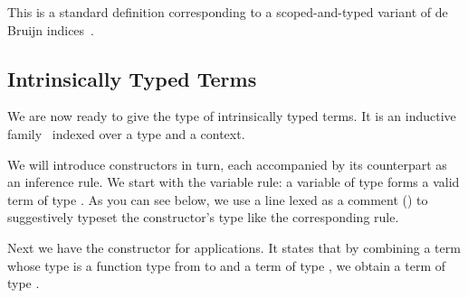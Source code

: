 \documentclass{article}
\begin{document}
\noindent
\begin{minipage}{.5\textwidth}
\end{minipage}\hfill
\begin{minipage}{.45\textwidth}
\end{minipage}

This is a standard definition
corresponding to a scoped-and-typed variant of de Bruijn
indices~\cite{de1972lambda}.

\subsection{Intrinsically Typed Terms}

We are now ready to give the type of intrinsically typed terms.
It is an inductive family~\cite{DBLP:journals/fac/Dybjer94}
indexed over a type and a context.


We will introduce constructors in turn, each accompanied by its
counterpart as an inference rule.
%
We start with the variable rule: a variable of type 
forms a valid term of type .
%
As you can see below, we use a line lexed as a comment (\AC{---})
to suggestively typeset the constructor's type like the
corresponding rule.

\noindent
\begin{minipage}[t]{.5\textwidth}
\end{minipage}\hfill
\begin{minipage}[t]{.35\textwidth}
\begin{mathpar}
\end{mathpar}
\end{minipage}

Next we have the constructor for applications. It states that
by combining a term whose type is a function type from  to 
and a term of type , we obtain a term of type .

\noindent
\begin{minipage}[t]{.5\textwidth}
\end{minipage}\hfill
\begin{minipage}[t]{.35\textwidth}
\begin{mathpar}
\end{mathpar}
\end{minipage}
\end{document}
